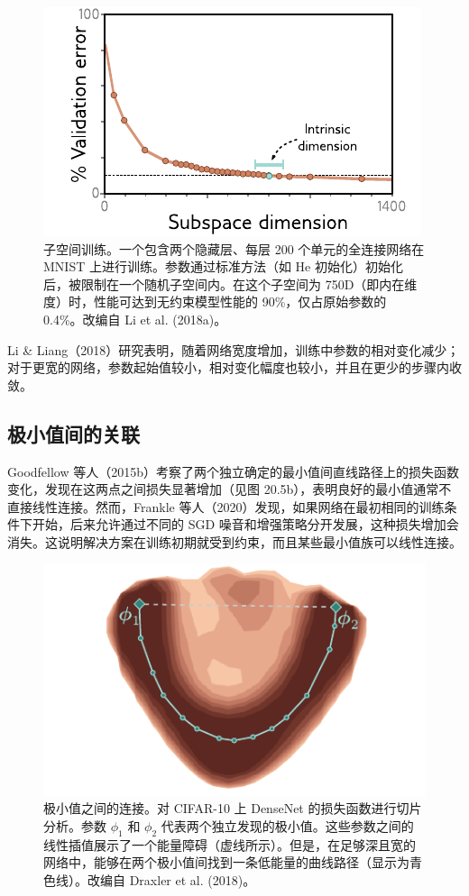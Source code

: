 \documentclass[lang=cn,newtx,10pt,scheme=chinese]{elegantbook}
\begin{document}
\begin{figure}[ht!]
\centering
\includegraphics[width=0.7\linewidth]{PDFFigures/UDLChap21PDF/WhySubspace.pdf}
\caption{子空间训练。一个包含两个隐藏层、每层 200 个单元的全连接网络在 MNIST 上进行训练。参数通过标准方法（如 He 初始化）初始化后，被限制在一个随机子空间内。在这个子空间为 750D（即内在维度）时，性能可达到无约束模型性能的 90\%，仅占原始参数的 0.4\%。改编自 Li et al. (2018a)。}
\end{figure}

Li \& Liang（2018）研究表明，随着网络宽度增加，训练中参数的相对变化减少；对于更宽的网络，参数起始值较小，相对变化幅度也较小，并且在更少的步骤内收敛。

\subsection{极小值间的关联}
Goodfellow 等人（2015b）考察了两个独立确定的最小值间直线路径上的损失函数变化，发现在这两点之间损失显著增加（见图 20.5b），表明良好的最小值通常不直接线性连接。然而，Frankle 等人（2020）发现，如果网络在最初相同的训练条件下开始，后来允许通过不同的 SGD 噪音和增强策略分开发展，这种损失增加会消失。这说明解决方案在训练初期就受到约束，而且某些最小值族可以线性连接。

\begin{figure}[ht!]
\centering
\includegraphics[width=0.7\linewidth]{PDFFigures/UDLChap21PDF/WhyDraxler.pdf}
\caption{极小值之间的连接。对 CIFAR-10 上 DenseNet 的损失函数进行切片分析。参数 \(\phi_1\) 和 \(\phi_2\) 代表两个独立发现的极小值。这些参数之间的线性插值展示了一个能量障碍（虚线所示）。但是，在足够深且宽的网络中，能够在两个极小值间找到一条低能量的曲线路径（显示为青色线）。改编自 Draxler et al. (2018)。}
\end{figure}
\end{document}
